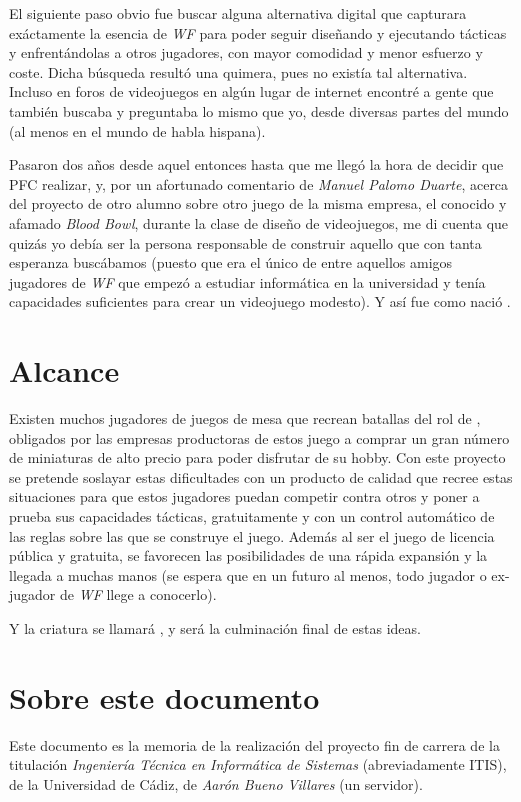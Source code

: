 El siguiente paso obvio fue buscar alguna alternativa digital que
capturara exáctamente la esencia de \textit{WF} para poder seguir
diseñando y ejecutando tácticas  y enfrentándolas a otros jugadores,
con mayor comodidad y menor esfuerzo y coste. Dicha búsqueda resultó
una quimera, pues no existía tal alternativa. Incluso en foros de
videojuegos en algún lugar de internet encontré a gente que también
buscaba y preguntaba lo mismo que yo, desde diversas partes del mundo
(al menos en el mundo de habla hispana).
  
Pasaron dos años desde aquel entonces hasta que me llegó la hora de
decidir que PFC realizar, y, por un afortunado comentario de
\textit{Manuel Palomo Duarte}, acerca del proyecto de otro alumno
sobre otro juego de la misma empresa, el conocido y afamado
\emph{Blood Bowl}, durante la clase de diseño de videojuegos, me di
cuenta que quizás yo debía ser la persona responsable de construir
aquello que con tanta esperanza buscábamos (puesto que era el único de
entre aquellos amigos jugadores de \textit{WF} que empezó a estudiar
informática en la universidad y tenía capacidades suficientes para
crear un videojuego modesto). Y así fue como nació \gomf.

\section{Alcance}
Existen muchos jugadores de juegos de mesa que recrean batallas del
rol de \gomf, obligados por las empresas productoras de estos juego a
comprar un gran número de miniaturas de alto precio para poder
disfrutar de su hobby. Con este proyecto se pretende soslayar estas
dificultades con un producto de calidad que recree estas situaciones
para que estos jugadores puedan competir contra otros y poner a prueba
sus capacidades tácticas, gratuitamente y con un control automático de
las reglas sobre las que se construye el juego. Además al ser el juego
de licencia pública y gratuita, se favorecen las posibilidades de una
rápida expansión y la llegada a muchas manos (se espera que en un
futuro al menos, todo jugador o ex-jugador de \textit{WF} llege a
conocerlo).

Y la criatura se llamará \gomf, y será la culminación final de estas ideas.

\section {Sobre este documento}
Este documento es la memoria de la realización del proyecto fin de
carrera de la titulación \emph{Ingeniería Técnica en Informática de
  Sistemas} (abreviadamente ITIS), de la Universidad de Cádiz, de
\textit{Aarón Bueno Villares} (un servidor).

